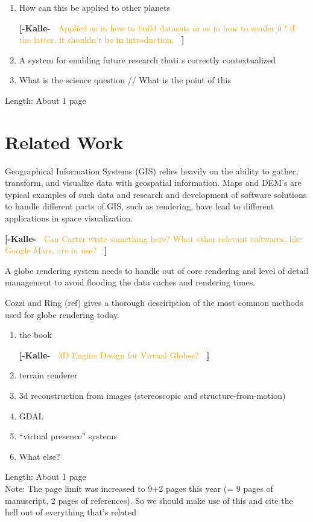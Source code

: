 \documentclass[journal]{vgtc}                %
\newcommand{\kallecomment}[1]{\textbf{[-Kalle-~}
    \textcolor{orange}{#1}
    \textbf{~]}}
\begin{document}
\begin{enumerate}
\kallecomment{Areoid: geoid but for Mars. Areography, Martian geography.}




\kallecomment{Other datasets? Does ESA have Mars missions of interest?}

\item How can this be applied to other planets

\kallecomment{Applied as in how to build datasets or as in how to render it? if the latter, it shouldn't be in introduction.}

\item A system for enabling future research thati s correctly contextualized
\item What is the science question // What is the point of this
\end{enumerate}
Length: About 1 page

\section{Related Work} \label{sec:relatedwork}

Geographical Information Systems (GIS) relies heavily on the ability to gather, transform, and visualize data with geospatial information.
Maps and DEM's are typical examples of such data and research and development of software solutions to handle different parts of GIS, such as rendering, have lead to different applications in space visualization.

\kallecomment{Can Carter write something here? What other relevant softwares, like Google Mars, are in use?}

A globe rendering system needs to handle out of core rendering and level of detail management to avoid flooding the data caches and rendering times.

Cozzi and Ring (ref) gives a thorough desciription of the most common methods used for globe rendering today. 

\begin{enumerate}
\item the book

\kallecomment{3D Engine Design for Virtual Globes?}

\item terrain renderer
\item 3d reconstruction from images (stereoscopic and structure-from-motion)
\item GDAL
\item ``virtual presence'' systems
\item What else?
\end{enumerate}
Length: About 1 page\\
Note:  The page limit was increased to 9+2 pages this year (= 9 pages of manuscript, 2 pages of references). So we should make use of this and cite the hell out of everything that's related
\end{document}
